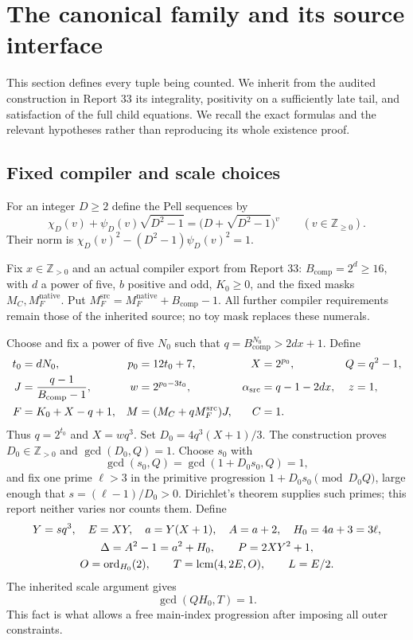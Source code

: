 \documentclass[11pt,letterpaper]{article}
\theoremstyle{definition}\newtheorem{definition}[theorem]{Definition}
\theoremstyle{remark}\newtheorem{remark}[theorem]{Remark}
\newcommand{\Z}{\mathbb Z}\newcommand{\Np}{\mathbb Z_{>0}}
\newcommand{\pos}{\mathbb Z_{>0}}
\newcommand{\ord}{\operatorname{ord}}
\newcommand{\lcm}{\operatorname{lcm}}
\newcommand{\MFsrc}{M_F^{\mathrm{src}}}
\newcommand{\asrc}{\alpha_{\mathrm{src}}}
\begin{document}
\section{The canonical family and its source interface}\label{fup:hc:sec:family}
This section defines every tuple being counted. We inherit from the audited construction in Report 33 its integrality, positivity on a sufficiently late tail, and satisfaction of the full child equations. We recall the exact formulas and the relevant hypotheses rather than reproducing its whole existence proof.

\subsection{Fixed compiler and scale choices}
For an integer $D\ge2$ define the Pell sequences by
\begin{equation}\label{fup:hc:eq:pell}
 \chi_D(v)+\psi_D(v)\sqrt{D^2-1}
   =\bigl(D+\sqrt{D^2-1}\bigr)^v\qquad(v\in\Z_{\ge0}).
\end{equation}
Their norm is $\chi_D(v)^2-(D^2-1)\psi_D(v)^2=1$.

Fix $x\in\pos$ and an actual compiler export from Report 33: $B_{\mathrm{comp}}=2^d\ge16$, with $d$ a power of five, $b$ positive and odd, $K_0\ge0$, and the fixed masks $M_C,M_F^{\mathrm{native}}$. Put $\MFsrc=M_F^{\mathrm{native}}+B_{\mathrm{comp}}-1$. All further compiler requirements remain those of the inherited source; no toy mask replaces these numerals.

Choose and fix a power of five $N_0$ such that $q=B_{\mathrm{comp}}^{N_0}>2dx+1$. Define
\begin{align}\label{fup:hc:eq:scale1}
 t_0&=dN_0,&p_0&=12t_0+7,& X&=2^{p_0},&Q&=q^2-1,\notag\\
 J&=\frac{q-1}{B_{\mathrm{comp}}-1},&w&=2^{p_0-3t_0},&
 \asrc&=q-1-2dx,&z&=1,\\
 F&=K_0+X-q+1,&M&=(M_C+q\MFsrc)J,& C&=1.&\notag
\end{align}
Thus $q=2^{t_0}$ and $X=wq^3$. Set $D_0=4q^3(X+1)/3$. The construction proves $D_0\in\pos$ and $\gcd(D_0,Q)=1$. Choose $s_0$ with
\[
 \gcd(s_0,Q)=\gcd(1+D_0s_0,Q)=1,
\]
and fix one prime $\ell>3$ in the primitive progression $1+D_0s_0\pmod{D_0Q}$, large enough that $s=(\ell-1)/D_0>0$. Dirichlet's theorem supplies such primes; this report neither varies nor counts them. Define
\begin{gather}\label{fup:hc:eq:scale2}
 Y=sq^3,\quad E=XY,\quad a=Y(X+1),\quad A=a+2,\quad
 H_0=4a+3=3\ell,\\
 \Delta=A^2-1=a^2+H_0,\qquad P=2XY^2+1,\notag\\
 O=\ord_{H_0}(2),\qquad T=\lcm(4,2E,O),\qquad L=E/2.\notag
\end{gather}
The inherited scale argument gives
\begin{equation}\label{fup:hc:eq:crtcompat}
 \gcd(QH_0,T)=1.
\end{equation}
This fact is what allows a free main-index progression after imposing all outer constraints.
\end{document}
